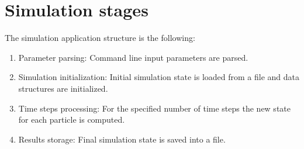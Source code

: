 \section{Simulation stages}

The simulation application structure is the following:

\begin{enumerate}
\item Parameter parsing: Command line input parameters are parsed.
\item Simulation initialization: Initial simulation state is loaded from a file
and data structures are initialized.
\item Time steps processing: For the specified number of time steps the new
state for each particle is computed.
\item Results storage: Final simulation state is saved into a file.
\end{enumerate}






